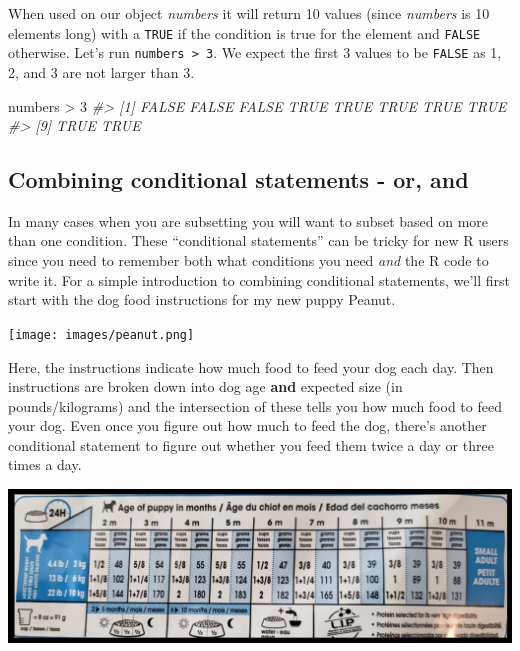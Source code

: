 \documentclass[
  12pt,
  openany]{book}
\newenvironment{Shaded}{\begin{snugshade}}{\end{snugshade}}
\newcommand{\CommentTok}[1]{\textcolor[rgb]{0.37,0.37,0.37}{\textit{#1}}}
\newcommand{\DecValTok}[1]{\textcolor[rgb]{0.06,0.06,0.06}{#1}}
\newcommand{\NormalTok}[1]{#1}
\newcommand{\SpecialCharTok}[1]{\textcolor[rgb]{0,0,0}{#1}}
\begin{document}
When used on our object \emph{numbers} it will return 10 values (since \emph{numbers} is 10 elements long) with a \texttt{TRUE} if the condition is true for the element and \texttt{FALSE} otherwise. Let's run \texttt{numbers\ \textgreater{}\ 3}. We expect the first 3 values to be \texttt{FALSE} as 1, 2, and 3 are not larger than 3.

\begin{Shaded}
\begin{Highlighting}[]
\NormalTok{numbers }\SpecialCharTok{\textgreater{}} \DecValTok{3}
\CommentTok{\#\textgreater{}  [1] FALSE FALSE FALSE  TRUE  TRUE  TRUE  TRUE  TRUE}
\CommentTok{\#\textgreater{}  [9]  TRUE  TRUE}
\end{Highlighting}
\end{Shaded}

\hypertarget{combining-conditional-statements---or-and}{%
\subsection{Combining conditional statements - or, and}\label{combining-conditional-statements---or-and}}

In many cases when you are subsetting you will want to subset based on more than one condition. These ``conditional statements'' can be tricky for new R users since you need to remember both what conditions you need \emph{and} the R code to write it. For a simple introduction to combining conditional statements, we'll first start with the dog food instructions for my new puppy Peanut.

\texttt{[image: images/peanut.png]}

Here, the instructions indicate how much food to feed your dog each day. Then instructions are broken down into dog age \textbf{and} expected size (in pounds/kilograms) and the intersection of these tells you how much food to feed your dog. Even once you figure out how much to feed the dog, there's another conditional statement to figure out whether you feed them twice a day or three times a day.

\includegraphics{images/dog_food.PNG}
\end{document}

